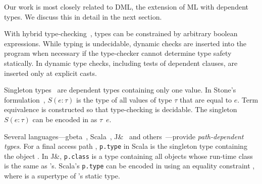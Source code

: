 
Our work is most closely related to DML, the extension of ML with dependent types. We discuss this in detail in the next section.



With hybrid type-checking~\cite{flanagan-popl06,flanagan-fool06},
types can be constrained by arbitrary boolean expressions.
While typing is undecidable, dynamic checks are inserted into
the program when necessary if the type-checker cannot determine
type safety statically.
In \Xten{} dynamic type checks, including tests of dependent
clauses, are inserted only at explicit casts.


Singleton types~\cite{aspinall-singletons,stone00} are dependent
types containing only one value.  
In Stone's formulation~\cite{stone00},
$S(e : \tau)$
is the type of all values of type $\tau$ that are equal to $e$.
Term equivalence is
constructed so that type-checking is decidable.
The singleton $S(e: \tau)$ can be encoded in \Xten{} as
$\tau$~$e$\xcd{)}.



Several languages---gbeta~\cite{ernst99-gbeta},
Scala~\cite{scala-overview,scala-oopsla05}, J\&~\cite{nqm06} and
others~\cite{oz01,ocrz-ecoop03}---provide {\em path-dependent
types}.  For a final access path , {\tt p.type}
in Scala is the singleton type containing the object .
In J\&, {\tt p.class} is a type containing all objects
whose run-time class is the same as 's.
Scala's {\tt p.type} can be encoded in \Xten{} using an equality
constraint , where  is a supertype of
's static type.


